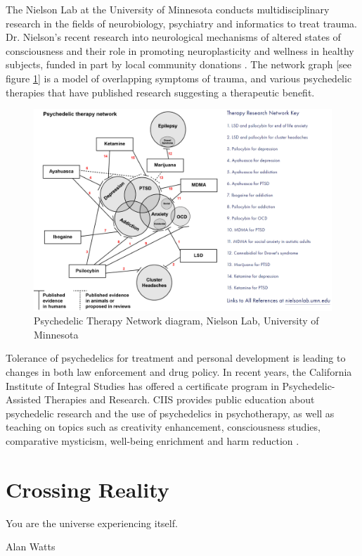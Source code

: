 \documentclass{UIdahoMastersThesis}
\begin{document}
The Nielson Lab at the University of Minnesota conducts multidisciplinary research in the fields of neurobiology, psychiatry and informatics to treat trauma. Dr. Nielson's recent research into neurological mechanisms of altered states of consciousness and their role in promoting neuroplasticity and wellness in healthy subjects, funded in part by local community donations \cite{noauthor_nielson_nodate}. The network graph [see figure \ref{fig:therapy}] is a model of overlapping symptoms of trauma, and various psychedelic therapies that have published research suggesting a therapeutic benefit.

\begin{figure}
	\centering
	\includegraphics[width=\linewidth]{therapy.png}	
	\caption{Psychedelic Therapy Network diagram, Nielson Lab, University of Minnesota}
	\label{fig:therapy}
\end{figure}

Tolerance of psychedelics for treatment and personal development is leading to changes in both law enforcement and drug policy. In recent years, the California Institute of Integral Studies has offered a certificate program in Psychedelic-Assisted Therapies and Research. CIIS provides public education about psychedelic research and the use of psychedelics in psychotherapy, as well as teaching on topics such as creativity enhancement, consciousness studies, comparative mysticism, well-being enrichment and harm reduction \cite{noauthor_ciis_nodate}.

\clearpage


\chapter{Crossing Reality}
\noindent
{%
\setlength{\fboxsep}{0pt}%
\setlength{\fboxrule}{1.5pt}%
%
}%
\label{Chapter:CrossingReality}
\epigraph {You are the universe experiencing itself.}{Alan Watts}
\end{document}
